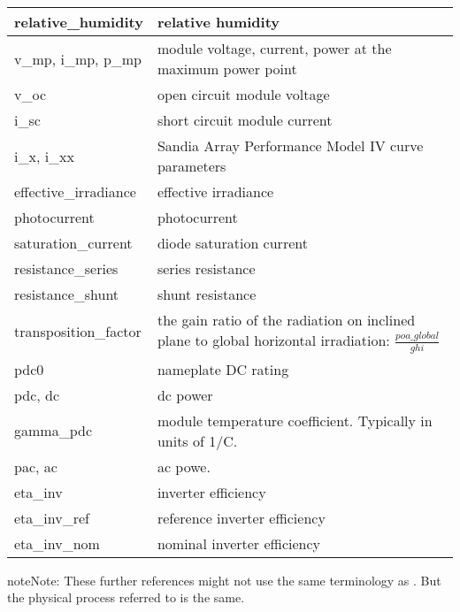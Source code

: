 \documentclass[letterpaper,10pt,english]{sphinxmanual}
\begin{document}
\begin{longtable}{|l|l|}
\hline
relative\_humidity
&
relative humidity
\\
\hline
v\_mp, i\_mp, p\_mp
&
module voltage, current, power at the maximum power point
\\
\hline
v\_oc
&
open circuit module voltage
\\
\hline
i\_sc
&
short circuit module current
\\
\hline
i\_x, i\_xx
&
Sandia Array Performance Model IV curve parameters
\\
\hline
effective\_irradiance
&
effective irradiance
\\
\hline
photocurrent
&
photocurrent
\\
\hline
saturation\_current
&
diode saturation current
\\
\hline
resistance\_series
&
series resistance
\\
\hline
resistance\_shunt
&
shunt resistance
\\
\hline
transposition\_factor
&
the gain ratio of the radiation on inclined plane to global horizontal irradiation: \(\frac{poa\_global}{ghi}\)
\\
\hline
pdc0
&
nameplate DC rating
\\
\hline
pdc, dc
&
dc power
\\
\hline
gamma\_pdc
&
module temperature coefficient. Typically in units of 1/C.
\\
\hline
pac, ac
&
ac powe.
\\
\hline
eta\_inv
&
inverter efficiency
\\
\hline
eta\_inv\_ref
&
reference inverter efficiency
\\
\hline
eta\_inv\_nom
&
nominal inverter efficiency
\\
\hline\end{longtable}


\begin{sphinxadmonition}{note}{Note:}
These further references might not use the same terminology as . But the physical process referred to is the same.
\end{sphinxadmonition}
\end{document}
